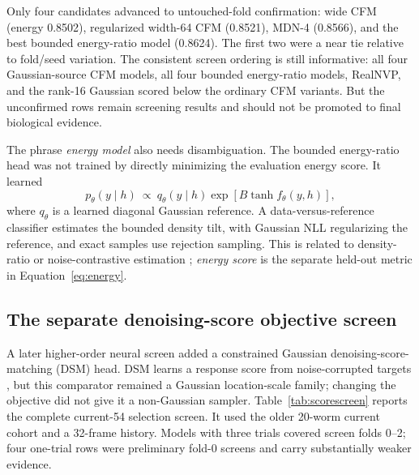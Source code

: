 \documentclass[11pt]{article}
\begin{document}
Only four candidates advanced to untouched-fold confirmation: wide CFM (energy 0.8502), regularized width-64 CFM (0.8521), MDN-4 (0.8566), and the best bounded energy-ratio model (0.8624). The first two were a near tie relative to fold/seed variation. The consistent screen ordering is still informative: all four Gaussian-source CFM models, all four bounded energy-ratio models, RealNVP, and the rank-16 Gaussian scored below the ordinary CFM variants. But the unconfirmed rows remain screening results and should not be promoted to final biological evidence.

The phrase \emph{energy model} also needs disambiguation. The bounded energy-ratio head was not trained by directly minimizing the evaluation energy score. It learned
\begin{equation}
 p_\theta(y\mid h)\ \propto\ q_\theta(y\mid h)
 \exp\!\left[B\tanh f_\theta(y,h)\right],
 \label{eq:energytilt}
\end{equation}
where $q_\theta$ is a learned diagonal Gaussian reference. A data-versus-reference classifier estimates the bounded density tilt, with Gaussian NLL regularizing the reference, and exact samples use rejection sampling. This is related to density-ratio or noise-contrastive estimation \citep{gutmann2010nce}; \emph{energy score} is the separate held-out metric in Equation~\ref{eq:energy}.

\subsection{The separate denoising-score objective screen}

A later higher-order neural screen added a constrained Gaussian denoising-score-matching (DSM) head. DSM learns a response score from noise-corrupted targets \citep{hyvarinen2005score,vincent2011denoising}, but this comparator remained a Gaussian location-scale family; changing the objective did not give it a non-Gaussian sampler. Table~\ref{tab:scorescreen} reports the complete current-54 selection screen. It used the older 20-worm current cohort and a 32-frame history. Models with three trials covered screen folds 0--2; four one-trial rows were preliminary fold-0 screens and carry substantially weaker evidence.
\end{document}

